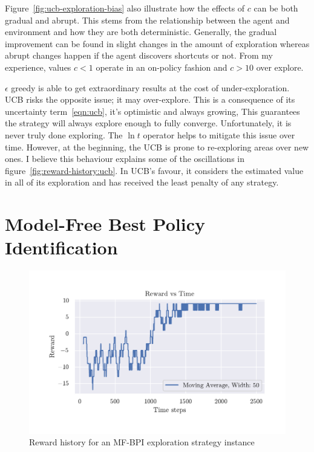 \documentclass[]{final_report}
\begin{document}
Figure~\ref{fig:ucb-exploration-bias} also illustrate how the effects of $c$ can be both gradual and abrupt. This stems from the relationship between the agent and environment and how they are both deterministic. Generally, the gradual improvement can be found in slight changes in the amount of exploration whereas abrupt changes happen if the agent discovers shortcuts or not.  From my experience, values $c<1$ operate in an on-policy fashion and $c>10$ over explore.

$\epsilon$ greedy is able to get extraordinary results at the cost of under-exploration. UCB risks the opposite issue; it may over-explore. This is a consequence of its uncertainty term~\ref{eqn:ucb}, it's optimistic and always growing, This guarantees the strategy will always explore enough to fully converge. Unfortunately, it is never truly done exploring. The $\ln t$ operator helps to mitigate this issue over time. However, at the beginning, the UCB is prone to re-exploring areas over new ones. I believe this behaviour explains some of the oscillations in figure~\ref{fig:reward-history:ucb}. In UCB's favour, it considers the estimated value in all of its exploration and has received the least penalty of any strategy.


\section{Model-Free Best Policy Identification}

\begin{figure}[H]
  \centering
  
  \includegraphics[trim={0 1cm 0 1cm},clip,width=\textwidth]{reward-history/MF-BPI.pdf}
  
  \caption{\label{fig:reward-history:mfbpi} Reward history for an MF-BPI exploration strategy instance}
\end{figure}
\end{document}
